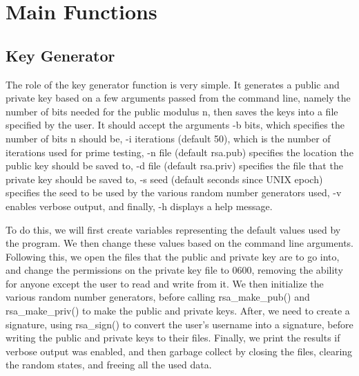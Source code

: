 \documentclass[11pt]{article}
\begin{document}
\section{Main Functions}

\subsection{Key Generator}

The role of the key generator function is very simple. It generates a public and private key based on a few arguments passed from the command line, namely the number of bits needed for the public modulus n, then saves the keys into a file specified by the user. It should accept the arguments -b bits, which specifies the number of bits n should be, -i iterations (default 50), which is the number of iterations used for prime testing, -n file (default rsa.pub) specifies the location the public key should be saved to, -d file (default rsa.priv) specifies the file that the private key should be saved to, -s seed (default seconds since UNIX epoch) specifies the seed to be used by the various random number generators used, -v enables verbose output, and finally, -h displays a help message.

To do this, we will first create variables representing the default values used by the program. We then change these values based on the command line arguments. Following this, we open the files that the public and private key are to go into, and change the permissions on the private key file to 0600, removing the ability for anyone except the user to read and write from it. We then initialize the various random number generators, before calling rsa\_make\_pub() and rsa\_make\_priv() to make the public and private keys. After, we need to create a signature, using rsa\_sign() to convert the user's username into a signature, before writing the public and private keys to their files. Finally, we print the results if verbose output was enabled, and then garbage collect by closing the files, clearing the random states, and freeing all the used data.
\end{document}
